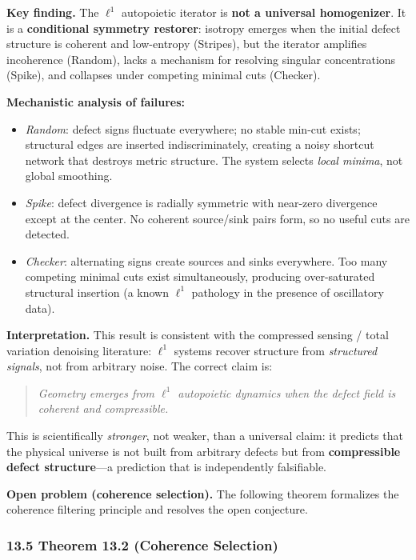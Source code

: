 \documentclass[
]{article}
\providecommand{\tightlist}{%
  \setlength{\itemsep}{0pt}\setlength{\parskip}{0pt}}
\begin{document}
\textbf{Key finding.} The \(\ell^1\) autopoietic iterator is \textbf{not
a universal homogenizer}. It is a \textbf{conditional symmetry
restorer}: isotropy emerges when the initial defect structure is
coherent and low-entropy (Stripes), but the iterator amplifies
incoherence (Random), lacks a mechanism for resolving singular
concentrations (Spike), and collapses under competing minimal cuts
(Checker).

\textbf{Mechanistic analysis of failures:}

\begin{itemize}
\tightlist
\item
  \emph{Random}: defect signs fluctuate everywhere; no stable min-cut
  exists; structural edges are inserted indiscriminately, creating a
  noisy shortcut network that destroys metric structure. The system
  selects \emph{local minima}, not global smoothing.
\item
  \emph{Spike}: defect divergence is radially symmetric with near-zero
  divergence except at the center. No coherent source/sink pairs form,
  so no useful cuts are detected.
\item
  \emph{Checker}: alternating signs create sources and sinks everywhere.
  Too many competing minimal cuts exist simultaneously, producing
  over-saturated structural insertion (a known \(\ell^1\) pathology in
  the presence of oscillatory data).
\end{itemize}

\textbf{Interpretation.} This result is consistent with the compressed
sensing / total variation denoising literature: \(\ell^1\) systems
recover structure from \emph{structured signals}, not from arbitrary
noise. The correct claim is:

\begin{quote}
\emph{Geometry emerges from \(\ell^1\) autopoietic dynamics when the
defect field is coherent and compressible.}
\end{quote}

This is scientifically \emph{stronger}, not weaker, than a universal
claim: it predicts that the physical universe is not built from
arbitrary defects but from \textbf{compressible defect structure}---a
prediction that is independently falsifiable.

\textbf{Open problem (coherence selection).} The following theorem
formalizes the coherence filtering principle and resolves the open
conjecture.

\subsubsection{13.5 Theorem 13.2 (Coherence
Selection)}\label{theorem-13.2-coherence-selection}
\end{document}
